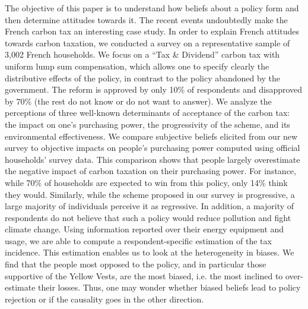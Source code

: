 \documentclass[12pt]{article} %
\begin{document}
The objective of this paper is to understand how beliefs about a policy form and then determine attitudes towards it. The recent events undoubtedly make the French carbon tax an interesting case study. In order to explain French attitudes towards carbon taxation, we conducted a survey on a representative sample of 3,002 French households. We focus on a ``Tax \& Dividend'' carbon tax with uniform lump sum compensation, which allows one to specify clearly the distributive effects of the policy, in contrast to the policy abandoned by the government. The reform is approved by only 10\% of respondents and disapproved by 70\% (the rest do not know or do not want to answer). We analyze the perceptions of three well-known determinants of acceptance of the carbon tax: the impact on one's purchasing power, the progressivity of the scheme, and its environmental effectiveness. We compare subjective beliefs elicited from our new survey to objective impacts on people's purchasing power computed using official households' survey data. This comparison shows that people largely overestimate the negative impact of carbon taxation on their purchasing power. For instance, while 70\% of households are expected to win from this policy, only 14\% think they would. Similarly, while the scheme proposed in our survey is progressive, a large majority of individuals perceive it as regressive. In addition, a majority of respondents do not believe that such a policy would reduce pollution and fight climate change. Using information reported over their energy equipment and usage, we are able to compute a respondent-specific estimation of the tax incidence. This estimation enables us to look at the heterogeneity in biases. We find that the people most opposed to the policy, and in particular those supportive of the Yellow Vests, are the most biased, i.e. the most inclined to over-estimate their losses. Thus, one may wonder whether biased beliefs lead to policy rejection or if the causality goes in the other direction.
\end{document}
